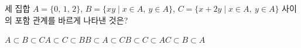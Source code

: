 세 집합 $A=\{0,\,1,\,2\}$, $B=\{xy \mid x\in A,\ y\in A\}$, $C=\{x+2y \mid x\in A,\ y\in A\}$ 사이의 포함 관계를 바르게 나타낸 것은?
\begin{choices32}{$A\subset B\subset C$}{$A\subset C\subset B$}{$B\subset A\subset C$}{$B\subset C\subset A$}{$C\subset B\subset A$}\end{choices32}
